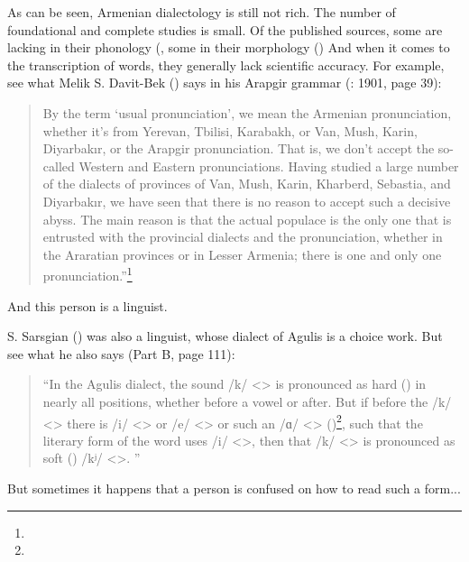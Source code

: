 As can be seen, Armenian dialectology is still not rich. The number of foundational and complete studies is small. Of the published sources, some are lacking in their phonology (, some in their morphology () And when it comes to the transcription of words, they generally lack scientific accuracy. For example, see what Melik S. Davit-Bek () says in his Arapgir grammar (\citeauthor{DavitBekArabgir}:  1901, page 39): 

\begin{quote}
	By the term `usual pronunciation', we mean the Armenian pronunciation, whether it's from Yerevan, Tbilisi, Karabakh, or Van, Mush, Karin, Diyarbakır, or the Arapgir pronunciation. That is, we don't accept the so-called Western and Eastern pronunciations. Having studied a large number of the dialects of provinces of Van, Mush, Karin, Kharberd, Sebastia, and Diyarbakır, we have seen that there is no reason to accept such a decisive abyss. The main reason is that the actual populace is the only one that is entrusted with the provincial dialects and the pronunciation, whether in the Araratian provinces or in Lesser Armenia; there is one and only one pronunciation.''\footnote{}
\end{quote}


And this person is a linguist.

S. Sarsgian () was also a linguist, whose dialect of Agulis is a choice work. But see what he also says (Part B, page 111):

\begin{quote}
	``In the Agulis dialect, the sound /k/ <> is pronounced as hard () in nearly all positions, whether before a vowel or after. But if before the /k/ <> there is /i/ <> or /e/ <> or such an /ɑ/ <> ()\footnote{}, such that the literary form of the word uses /i/ <>, then that /k/ <> is pronounced as soft () /kʲ/ <>. '' 
\end{quote}


But sometimes it happens that a person is confused on how to read such a form... 

\begin{adjarianpage}\label{page:5}\end{adjarianpage}%

